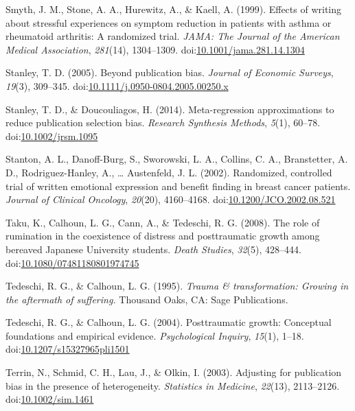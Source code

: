 \documentclass[man]{apa6}
\theoremstyle{definition}
\theoremstyle{definition}
\theoremstyle{definition}
\theoremstyle{remark}
\begin{document}
\hypertarget{ref-Smyth1999}{}
Smyth, J. M., Stone, A. A., Hurewitz, A., \& Kaell, A. (1999). Effects
of writing about stressful experiences on symptom reduction in patients
with asthma or rheumatoid arthritis: A randomized trial. \emph{JAMA: The
Journal of the American Medical Association}, \emph{281}(14),
1304--1309.
doi:\href{https://doi.org/10.1001/jama.281.14.1304}{10.1001/jama.281.14.1304}

\hypertarget{ref-Stanley2005}{}
Stanley, T. D. (2005). Beyond publication bias. \emph{Journal of
Economic Surveys}, \emph{19}(3), 309--345.
doi:\href{https://doi.org/10.1111/j.0950-0804.2005.00250.x}{10.1111/j.0950-0804.2005.00250.x}

\hypertarget{ref-Stanley2014}{}
Stanley, T. D., \& Doucouliagos, H. (2014). Meta-regression
approximations to reduce publication selection bias. \emph{Research
Synthesis Methods}, \emph{5}(1), 60--78.
doi:\href{https://doi.org/10.1002/jrsm.1095}{10.1002/jrsm.1095}

\hypertarget{ref-Stanton2002}{}
Stanton, A. L., Danoff-Burg, S., Sworowski, L. A., Collins, C. A.,
Branstetter, A. D., Rodriguez-Hanley, A., \ldots{} Austenfeld, J. L.
(2002). Randomized, controlled trial of written emotional expression and
benefit finding in breast cancer patients. \emph{Journal of Clinical
Oncology}, \emph{20}(20), 4160--4168.
doi:\href{https://doi.org/10.1200/JCO.2002.08.521}{10.1200/JCO.2002.08.521}

\hypertarget{ref-Taku2008}{}
Taku, K., Calhoun, L. G., Cann, A., \& Tedeschi, R. G. (2008). The role
of rumination in the coexistence of distress and posttraumatic growth
among bereaved Japanese University students. \emph{Death Studies},
\emph{32}(5), 428--444.
doi:\href{https://doi.org/10.1080/07481180801974745}{10.1080/07481180801974745}

\hypertarget{ref-Tedeschi1995}{}
Tedeschi, R. G., \& Calhoun, L. G. (1995). \emph{Trauma \&
transformation: Growing in the aftermath of suffering.} Thousand Oaks,
CA: Sage Publications.

\hypertarget{ref-Tedeschi2004}{}
Tedeschi, R. G., \& Calhoun, L. G. (2004). Posttraumatic growth:
Conceptual foundations and empirical evidence. \emph{Psychological
Inquiry}, \emph{15}(1), 1--18.
doi:\href{https://doi.org/10.1207/s15327965pli1501}{10.1207/s15327965pli1501}

\hypertarget{ref-Terrin2003}{}
Terrin, N., Schmid, C. H., Lau, J., \& Olkin, I. (2003). Adjusting for
publication bias in the presence of heterogeneity. \emph{Statistics in
Medicine}, \emph{22}(13), 2113--2126.
doi:\href{https://doi.org/10.1002/sim.1461}{10.1002/sim.1461}
\end{document}
